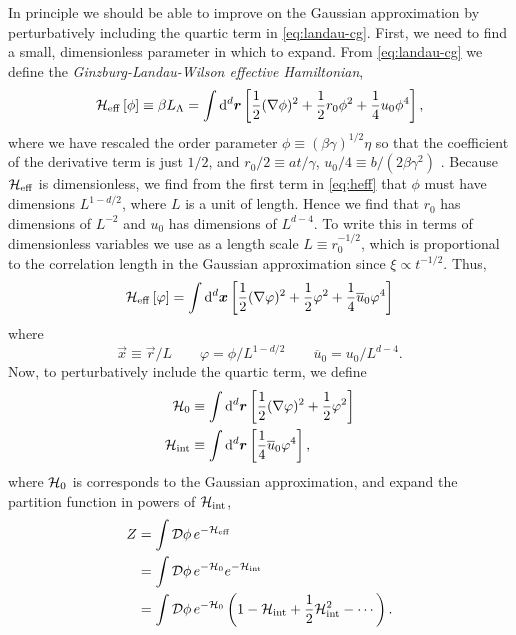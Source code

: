 In principle we should be able to improve on the Gaussian approximation by
perturbatively including the quartic term in \cref{eq:landau-cg}. First, we
need to find a small, dimensionless parameter in which to expand. From
\cref{eq:landau-cg} we define the \emph{Ginzburg-Landau-Wilson effective
  Hamiltonian},
\begin{equation}
  \mathcal{H}_{\mathrm{eff}}\left[\phi\right]
  \equiv \beta L_{\Lambda}
  = \int \mathop{}\!\mathrm{d}^d \bm{r} \left[
    \frac{1}{2}(\nabla\phi)^2 +
    \frac{1}{2} r_0 \phi^2 +
    \frac{1}{4} u_0 \phi^4\right],
  \label{eq:heff}
\end{equation}
where we have rescaled the order parameter
$\phi \equiv (\beta\gamma)^{1/2}\eta$
so that the coefficient of the derivative term is just $1/2$, and
$r_0/2 \equiv a t/\gamma$,
$u_0/4 \equiv b/(2 \beta \gamma^2)$
\autocite{goldenfeld1992lectures}.
Because $\mathcal{H}_{\mathrm{eff}}$ is dimensionless, we find from the first term in
\cref{eq:heff} that $\phi$ must have dimensions $L^{1-d/2}$, where $L$ is a
unit of length. Hence we find that $r_0$ has dimensions of $L^{-2}$ and $u_0$
has dimensions of $L^{d-4}$. To write this in terms of dimensionless variables
we use as a length scale $L \equiv r_0^{-1/2}$, which is proportional to the
correlation length in the Gaussian approximation since $\xi \propto t^{-1/2}$.
Thus,
\begin{equation}
  \mathcal{H}_{\mathrm{eff}}\left[\varphi\right]
  = \int \mathop{}\!\mathrm{d}^d \bm{x}
    \left[
      \frac{1}{2}
      (\nabla\varphi)^2 +
      \frac{1}{2} \varphi^2 +
      \frac{1}{4} \overline{u}_0 \varphi^4\right]
\end{equation}
where
\begin{equation}
  \vec{x}\equiv\vec{r}/L\qquad
  \varphi = \phi/L^{1-d/2}\qquad
  \overline{u}_0 = u_0/L^{d-4}.
\end{equation}
Now, to perturbatively include the quartic term, we define
\begin{align}
  \mathcal{H}_0 &\equiv \int\mathop{}\!\mathrm{d}^d\bm{r}\left[
    \frac{1}{2}(\nabla\varphi)^2 + \frac{1}{2} \varphi^2\right] \\
  \mathcal{H}_{\mathrm{int}} &\equiv \int\mathop{}\!\mathrm{d}^d\bm{r}\left[
      \frac{1}{4} \overline{u}_0 \varphi^4\right],
  \label{eq:ham-int}
\end{align}
where $\mathcal{H}_0$ is corresponds to the Gaussian approximation, and expand the
partition function in powers of $\mathcal{H}_{\mathrm{int}}$,
\begin{align*}
  Z
  &= \int\mathcal{D}\phi \, e^{-\mathcal{H}_{\mathrm{eff}}} \\
  &= \int\mathcal{D}\phi \, e^{-\mathcal{H}_0} e^{-\mathcal{H}_{\mathrm{int}}} \\
  &= \int\mathcal{D}\phi \, e^{-\mathcal{H}_0} \left(
    1 - \mathcal{H}_{\mathrm{int}} + \frac{1}{2} \mathcal{H}_{\mathrm{int}}^2 - \cdots\right).
\end{align*}
